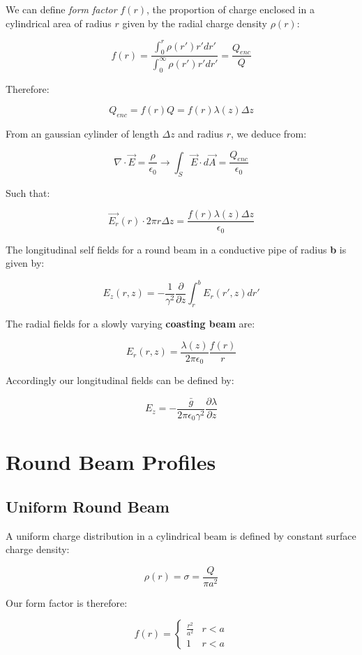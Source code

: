 We can define \textit{form factor} $f(r)$, the proportion of charge enclosed in a cylindrical area of radius $r$ given by the radial charge density $\rho(r)$:

$$f(r) =  \frac{\int_0^r \rho(r') r' dr'}{\int_0^\infty \rho(r') r' dr'} = \frac{Q_{enc}}{Q}$$

Therefore:

$$Q_{enc} = f(r) Q = f(r)\lambda(z) \Delta z$$

From an gaussian cylinder of length $\Delta z$ and radius $r$, we deduce from:

$$\nabla \cdot \vec{E} = \frac{\rho}{\epsilon_0} \rightarrow \int_S \vec{E}\cdot d\vec{A} = \frac{Q_{enc}}{\epsilon_0}$$

Such that:

$$\vec{E_r}(r) \cdot 2\pi r \Delta z = \frac{f(r) \lambda(z)\Delta z}{\epsilon_0}$$

The longitudinal self fields for a round beam in a conductive pipe of radius \textbf{b} is given by:

$$E_z(r, z) = -\frac{1}{\gamma^2}\frac{\partial}{\partial z}\int_r^bE_r(r', z)dr'$$

The radial fields for a slowly varying \textbf{coasting beam} are:

$$E_r(r, z) = \frac{\lambda(z)}{2\pi\epsilon_0}\frac{f(r)}{r}$$

Accordingly our longitudinal fields can be defined by:

\begin{equation}
    E_z = -\frac{\bar{g}}{2\pi\epsilon_0\gamma^2}\frac{\partial \lambda}{\partial z}
    \label{eq:longitudinal_self_fields}
\end{equation}

\section{Round Beam Profiles}

\subsection{Uniform Round Beam}

A uniform charge distribution in a cylindrical beam is defined by constant surface charge density:


$$\rho(r) = \sigma = \frac{Q}{\pi a^2}$$

Our form factor is therefore:

\[f(r) = \begin{cases}
        \frac{r^2}{a^2} & r < a \\
        1               & r < a
    \end{cases}\]

